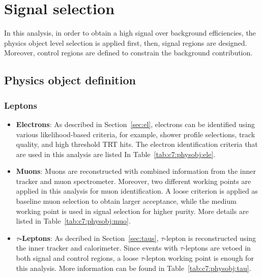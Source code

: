\chapter{Signal selection}

\label{ch:ana-sig}

\par In this analysis, in order to obtain a high signal over background efficiencies, the physics object level selection is applied first, then, signal regions are designed. 
Moreover, control regions are defined to constrain the background contribution.

\section{Physics object definition}
\label{sec:ana-sig:physobj}

\subsection{Leptons}

\begin{itemize}
    \item \textbf{Electrons}: As described in Section~\ref{sec:el}, electrons can be identified using various likelihood-based criteria, for example, shower profile selections, track quality, and high threshold TRT hits. The electron identification criteria that are used in this analysis are listed In Table~\ref{tab:c7:physobj:ele}.
    \item \textbf{Muons}: Muons are reconstructed with combined information from the inner tracker and muon spectrometer. Moreover, two different working points are applied in this analysis for muon identification. A loose criterion is applied as baseline muon selection to obtain larger acceptance, while the medium working point is used in signal selection for higher purity. More details are listed in Table~\ref{tab:c7:physobj:muo}.
    \item \textbf{$\tau$-Leptons}: As decribed in Section~\ref{sec:taus}, $\tau$-lepton is reconstructed using the inner tracker and calorimeter. Since events with $\tau$-leptons are vetoed in both signal and control regions, a loose $\tau$-lepton working point is enough for this analysis. More information can be found in Table~\ref{tab:c7:physobj:tau}.
\end{itemize}


